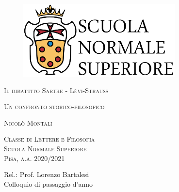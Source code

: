 \begin{titlepage}
    \begin{figure}
            \includegraphics[scale=0.45]{images/logosns.png}
            \flushleft
    \end{figure}
    
    \begin{center}  
        \vspace{0.5cm}
        \Huge
        \textsc{Il dibattito Sartre - Lévi-Strauss}
            
        \vspace{0.1cm}
        \LARGE
        \textsc{Un confronto storico-filosofico}
        \vspace{1.5cm}
        
        \Large
        \textsc{Nicolò Montali}
        \vspace{2.5cm}
        
        \large
        \textsc{Classe di Lettere e Filosofia}\\
        \textsc{Scuola Normale Superiore}\\
        \textsc{Pisa, a.a. 2020/2021}\\
        \vfill
    \end{center}    
    \flushright
    \Large
    Rel.: Prof. Lorenzo Bartalesi\\
    Colloquio di passaggio d'anno
    
    \vspace{0.8cm}
    
\end{titlepage}